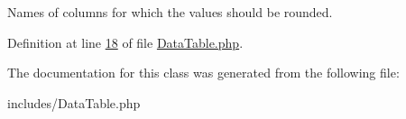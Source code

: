 Names of columns for which the values should be rounded. 



Definition at line \hyperlink{DataTable_8php_source_l00018}{18} of file \hyperlink{DataTable_8php_source}{Data\-Table.\-php}.



The documentation for this class was generated from the following file\-:\begin{DoxyCompactItemize}
\item 
includes/Data\-Table.\-php\end{DoxyCompactItemize}

